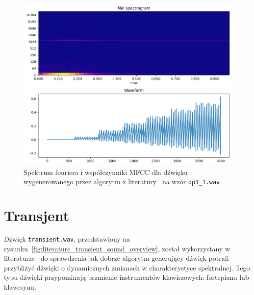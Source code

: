 \begin{multicols}{3}
\begin{figure}[H]
    \centering
    \includegraphics[width=0.9\linewidth]{rys06/macret_evolved_op1.png}
    \caption{
      Spektrum fouriera i współczynniki MFCC dla dźwięku wygenerowanego
      przez algorytm z literatury~\cite{evolutionary_puredata} na wzór \texttt{op1\_1.wav}.
    }\label{fig:evolved_literature_op1_sound_overview}
\end{figure}
\end{multicols}

\section{Transjent}

Dźwięk \texttt{transient.wav}, przedstawiony na rysunku~\ref{fig:literature_transient_sound_overview},
został wykorzystany w literaturze~\cite{evolutionary_puredata} do sprawdzenia jak dobrze algorytm
generujący dźwięk potrafi przybliżyć dźwięki o dynamicznych zmianach w charakterystyce spektralnej.
Tego typu dźwięki przypominają brzmienie instrumentów klawiszowych: fortepianu lub klawesynu.

